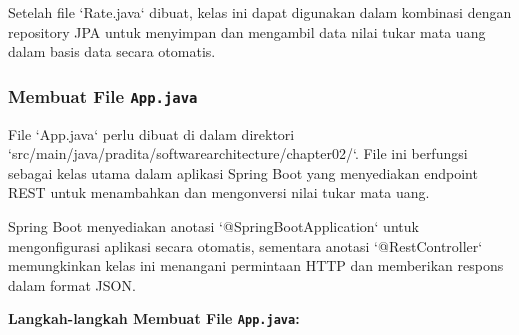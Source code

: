 Setelah file `Rate.java` dibuat, kelas ini dapat digunakan dalam kombinasi dengan repository JPA untuk menyimpan dan mengambil data nilai tukar mata uang dalam basis data secara otomatis.

\subsubsection{Membuat File \texttt{App.java}}
File `App.java` perlu dibuat di dalam direktori `src/main/java/pradita/softwarearchitecture/chapter02/`. File ini berfungsi sebagai kelas utama dalam aplikasi Spring Boot yang menyediakan endpoint REST untuk menambahkan dan mengonversi nilai tukar mata uang.

Spring Boot menyediakan anotasi `@SpringBootApplication` untuk mengonfigurasi aplikasi secara otomatis, sementara anotasi `@RestController` memungkinkan kelas ini menangani permintaan HTTP dan memberikan respons dalam format JSON.

\textbf{Langkah-langkah Membuat File \texttt{App.java}:}

